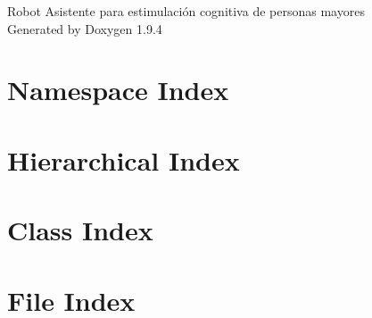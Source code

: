 \documentclass[twoside]{book}
\newcommand{\+}{\discretionary{\mbox{\scriptsize$\hookleftarrow$}}{}{}}
\newcommand{\clearemptydoublepage}{%
    \newpage{\pagestyle{empty}\cleardoublepage}%
  }
\begin{document}
  \raggedbottom
    \hypersetup{pageanchor=false,
                bookmarksnumbered=true,
                pdfencoding=unicode
               }
  \begin{titlepage}
  \vspace*{7cm}
  \begin{center}%
  {\Large Robot Asistente para estimulación cognitiva de personas mayores}\\
  \vspace*{1cm}
  {\large Generated by Doxygen 1.9.4}\\
  \end{center}
  \end{titlepage}
  \clearemptydoublepage
  \tableofcontents
  \clearemptydoublepage
  \hypersetup{pageanchor=true}
\chapter{Namespace Index}

\chapter{Hierarchical Index}

\chapter{Class Index}

\chapter{File Index}

\end{document}
